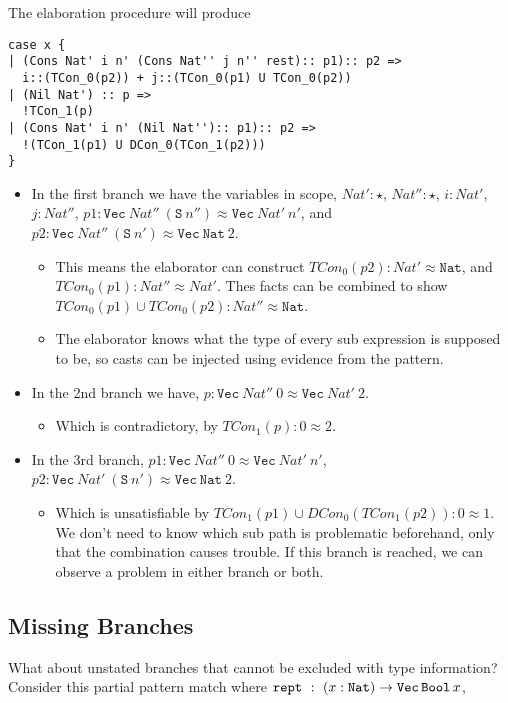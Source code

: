 The elaboration procedure will produce
 
\begin{lstlisting}[basicstyle={\ttfamily\small}]
case x {
| (Cons Nat' i n' (Cons Nat'' j n'' rest):: p1):: p2 =>
  i::(TCon_0(p2)) + j::(TCon_0(p1) U TCon_0(p2))
| (Nil Nat') :: p =>
  !TCon_1(p)
| (Cons Nat' i n' (Nil Nat''):: p1):: p2 =>
  !(TCon_1(p1) U DCon_0(TCon_1(p2)))
}
\end{lstlisting}
 
\begin{itemize}
\item
In the first branch we have the variables in scope, $Nat':\star$, $Nat'':\star$, $i:Nat'$, $j:Nat''$, $p1:\mathtt{Vec}\ Nat''\ (\mathtt{S}\ n'')\approx\mathtt{Vec}\ Nat'\ n'$, and $p2:\mathtt{Vec}\ Nat''\ (\mathtt{S}\ n')\approx\mathtt{Vec}\ \mathtt{Nat}\ 2$.
\begin{itemize}
\item
This means the elaborator can construct $TCon_0(p2):Nat'\approx\mathtt{Nat}$, and $TCon_0(p1):Nat''\approx Nat'$.
Thes facts can be combined to show $TCon_0(p1) \cup TCon_0(p2):Nat''\approx\mathtt{Nat}$.
\item
The elaborator knows what the type of every sub expression is supposed to be, so casts can be injected using evidence from the pattern.
\end{itemize}
\item
In the 2nd branch we have, $p:\mathtt{Vec}\ Nat''\ 0\approx\mathtt{Vec}\ Nat'\ 2$.
\begin{itemize}
\item
Which is contradictory, by $TCon_1(p):0\approx2$.
\end{itemize}
\item
{}
In the 3rd branch, $p1:\mathtt{Vec}\ Nat''\ 0\approx\mathtt{Vec}\ Nat'\ n'$, $p2:\mathtt{Vec}\ Nat'\ (\mathtt{S}\ n')\approx\mathtt{Vec}\ \mathtt{Nat}\ 2$.
\begin{itemize}
\item
Which is unsatisfiable by $TCon_1(p1) \cup DCon_0(TCon_1(p2)):0\approx1$.
We don't need to know which sub path is problematic beforehand, only that the combination causes trouble.
If this branch is reached, we can observe a problem in either branch or both.
\end{itemize}
\end{itemize}
 
\subsection{Missing Branches}
What about unstated branches that cannot be excluded with type information?
Consider this partial pattern match where $\mathtt{rept}\ :\ (x: \mathtt{Nat}{}) \rightarrow \mathtt{Vec}{}\,\mathtt{Bool}{}\,x$,
 

